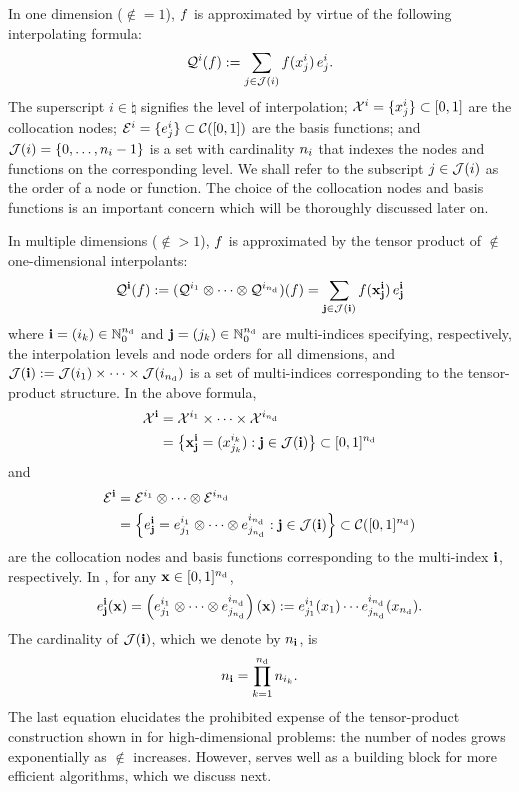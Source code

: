 In one dimension ($\nin = 1$), $f$ is approximated by virtue of the following
interpolating formula:
\begin{equation} \elab{tensor-1d}
  \tensor{i}(\f) := \sum_{j \in \index(i)} \f(\x^i_j) \, \e^i_j.
\end{equation}
The superscript $i \in \natural$ signifies the level of interpolation; $\mathcal{X}^i =
\{ x^i_j \} \subset [0, 1]$ are the collocation nodes; $\mathcal{E}^i = \{ e^i_j \}
\subset \mathcal{C}([0, 1])$ are the basis functions; and $\mathcal{J}(i) = \{ 0,
\dots, n_i - 1 \}$ is a set with cardinality $n_i$ that indexes the nodes and
functions on the corresponding level. We shall refer to the subscript $j \in
\mathcal{J}(i)$ as the order of a node or function. The choice of the collocation
nodes and basis functions is an important concern which will be thoroughly
discussed later on.

In multiple dimensions ($\nin > 1$), $f$ is approximated by the tensor product
of $\nin$ one-dimensional interpolants:
\begin{equation} \elab{tensor}
  \tensor{\vi}(\f) := (\tensor{i_1} \otimes \cdots \otimes \tensor{i_\nin})(\f) = \sum_{\vj \in \index(\vi)} \f(\vx^\vi_\vj) \, \e^\vi_\vj
\end{equation}
where $\mathbf{i} = (i_k) \in \mathbb{N}_0^{n_\text{d}}$ and $\mathbf{j} = (j_k) \in \mathbb{N}_0^{n_\text{d}}$ are
multi-indices specifying, respectively, the interpolation levels and node orders
for all dimensions, and $\mathcal{J}(\mathbf{i}) := \mathcal{J}(i_1) \times \cdots \times
\mathcal{J}(i_{n_\text{d}})$ is a set of multi-indices corresponding to the tensor-product
structure. In the above formula,
\begin{align}
  \X^\vi &= \X^{i_1} \times \cdots \times \X^{i_\nin} \elab{collocation-nodes} \\
         &= \left\{ \vx^\vi_\vj = (\x^{i_k}_{j_k}): \vj \in \index(\vi) \right\} \subset [0, 1]^\nin \nonumber
\end{align}
and
\begin{align}
  \E^\vi &= \E^{i_1} \otimes \cdots \otimes \E^{i_\nin} \elab{basis-functions} \\
         &= \left\{ \e^\vi_\vj = \e^{i_1}_{j_1} \otimes \cdots \otimes \e^{i_\nin}_{j_\nin}: \vj \in \index(\vi) \right\} \subset \continuous([0, 1]^\nin) \nonumber
\end{align}
are the collocation nodes and basis functions corresponding to the multi-index
$\mathbf{i}$, respectively. In , for any $\mathbf{x} \in [0, 1]^{n_\text{d}}$,
\[
  e^{\mathbf{i}}_{\mathbf{j}}(\mathbf{x}) = \left(e^{i_1}_{j_1} \otimes \cdots \otimes e^{i_{n_\text{d}}}_{j_{n_\text{d}}}\right)(\mathbf{x}) := e^{i_1}_{j_1}(x_1) \cdots e^{i_{n_\text{d}}}_{j_{n_\text{d}}}(x_{n_\text{d}}).
\]
The cardinality of $\mathcal{J}(\mathbf{i})$, which we denote by $n_{\mathbf{i}}$, is
\begin{equation} \elab{tensor-cardinality}
  \n_\vi = \prod_{k = 1}^\nin \n_{i_k}.
\end{equation}
The last equation elucidates the prohibited expense of the tensor-product
construction shown in  for high-dimensional problems: the number of
nodes grows exponentially as $\nin$ increases. However,  serves
well as a building block for more efficient algorithms, which we discuss next.

